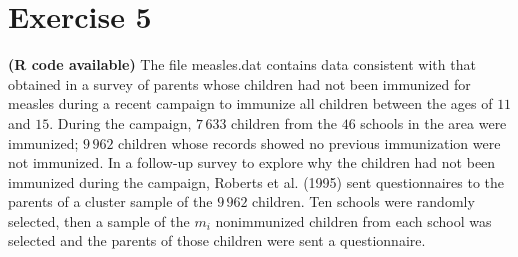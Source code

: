 \documentclass[12pt]{article}
\begin{document}
\section*{Exercise 5}
\textbf{\color{ForestGreen}(R code available)} The file measles.dat contains data consistent with that obtained in a survey of parents
whose children had not been immunized for measles during a recent campaign to
immunize all children between the ages of $11$ and $15$. During the campaign, $7\,633$ children
from the $46$ schools in the area were immunized; $9\,962$ children whose records
showed no previous immunization were not immunized. In a follow-up survey to
explore why the children had not been immunized during the campaign, Roberts
et al. (1995) sent questionnaires to the parents of a cluster sample of the $9\,962$ children.
Ten schools were randomly selected, then a sample of the $m_i$ nonimmunized
children from each school was selected and the parents of those children were sent a
questionnaire.
\end{document}
